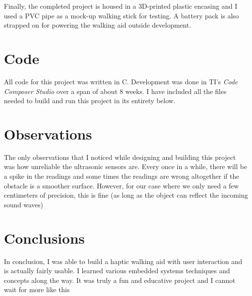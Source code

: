 \documentclass[11pt]{article}
\begin{document}
Finally, the completed project is housed in a 3D-printed plastic encasing and I used a PVC pipe as a mock-up walking stick for testing. A battery pack is also strapped on for powering
the walking aid outside development.

\section{Code}
\label{sec:orgd0e7caa}
All code for this project was written in C. Development was done in TI's \emph{Code Composer Studio} over a span of about 8 weeks. 
I have included all the files needed to build and run this project in its entirety below.

\clearpage

  


\section{Observations}
\label{sec:org99ab552}
The only observations that I noticed while designing and building this project was how unreliable the ultrasonic sensors are. 
Every once in a while, there will be a spike in the readings and some times the readings are wrong altogether if the obstacle is a smoother surface.
However, for our case where we only need a few centimeters of precision, this is fine (as long as the object can reflect the incoming sound waves)
\section{Conclusions}
\label{sec:org50d9f45}
In conclusion, I was able to build a haptic walking aid with user interaction and is actually fairly usable. I learned various embedded systems techniques and concepts along
the way. It was truly a fun and educative project and I cannot wait for more like this
\end{document}
